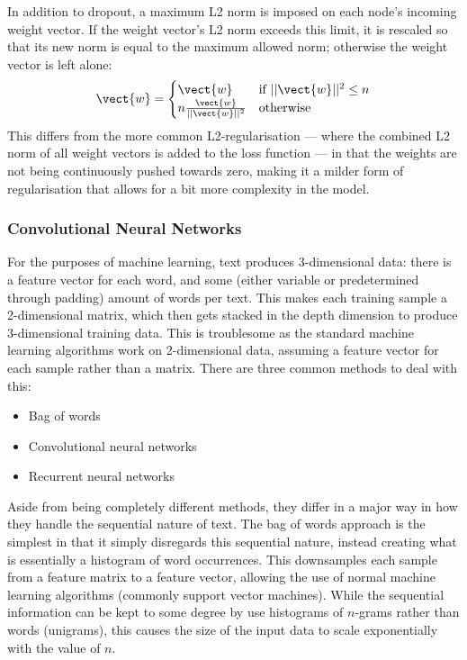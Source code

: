 In addition to dropout, a maximum L2 norm is imposed on each node's incoming
weight vector. If the weight vector's L2 norm exceeds this limit, it is rescaled
so that its new norm is equal to the maximum allowed norm; otherwise the weight
vector is left alone:
\begin{equation}
  \label{eq:norm}
  \vect{w} = \begin{cases}
    \vect{w}\,                          & \text{if } ||\vect{w}||^2 \leq n \\
    n \frac{\vect{w}}{||\vect{w}||^2} & \text{otherwise}
  \end{cases}
\end{equation}
This differs from the more common L2-regularisation --- where the combined L2
norm of all weight vectors is added to the loss function --- in that the weights
are not being continuously pushed towards zero, making it a milder form of
regularisation that allows for a bit more complexity in the model.

\subsubsection{Convolutional Neural Networks}
For the purposes of machine learning,
text produces 3-dimensional data: there is a feature vector for each word, and
some (either variable or predetermined through padding) amount of words per
text. This makes each training sample a 2-dimensional matrix, which then gets
stacked in the depth dimension to produce 3-dimensional training data. This is
troublesome as the standard machine learning algorithms work on 2-dimensional
data, assuming a feature vector for each sample rather than a matrix. There are
three common methods to deal with this:
\begin{itemize}
\item Bag of words
\item Convolutional neural networks
\item Recurrent neural networks
\end{itemize}

Aside from being completely different methods, they differ in a major way in how
they handle the sequential nature of text. The bag of words approach is the
simplest in that it simply disregards this sequential nature, instead creating
what is essentially a histogram of word occurrences. This downsamples each
sample from a feature matrix to a feature vector, allowing the use of normal
machine learning algorithms (commonly support vector machines). While the
sequential information can be kept to some degree by use histograms of $n$-grams
rather than words (unigrams), this causes the size of the input data to scale
exponentially with the value of $n$.

